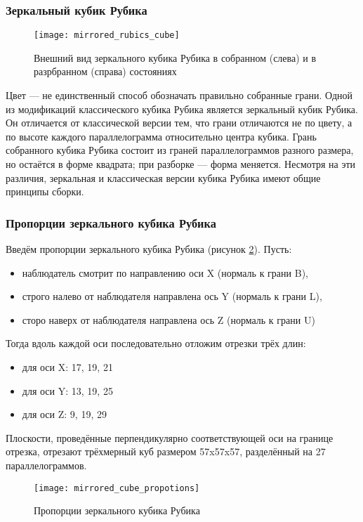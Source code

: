 \subsubsection{Зеркальный кубик Рубика}
\begin{figure}[ht]
	\centering
	\texttt{[image: mirrored\_rubics\_cube]}
	\caption{Внешний вид зеркального кубика Рубика в собранном (слева) и в разрбранном (справа) состояниях}
	\label{fig:mirrored_cube}
\end{figure}

Цвет --- не единственный способ обозначать правильно собранные грани. Одной из модификаций классического кубика Рубика является зеркальный кубик Рубика. Он отличается от классической версии тем, что грани отличаются не по цвету, а по высоте каждого параллелограмма относительно центра кубика. Грань собранного кубика Рубика состоит из граней параллелограммов разного размера, но остаётся в форме квадрата; при разборке --- форма меняется. Несмотря на эти различия, зеркальная и классическая версии кубика Рубика имеют общие принципы сборки.

\subsubsection{Пропорции зеркального кубика Рубика}
Введём пропорции зеркального кубика Рубика (рисунок \ref{fig:mirrored_cube_proportions}). Пусть:
\begin{itemize}
	\item наблюдатель смотрит по направлению оси X (нормаль к грани B),
	\item строго налево от наблюдателя направлена ось Y (нормаль к грани L),
	\item сторо наверх от наблюдателя направлена ось Z (нормаль к грани U)
\end{itemize}

Тогда вдоль каждой оси последовательно отложим отрезки трёх длин:
\begin{itemize}
	\item для оси X: 17, 19, 21
	\item для оси Y: 13, 19, 25
	\item для оси Z: 9, 19, 29
\end{itemize}

Плоскости, проведённые перпендикулярно соответствующей оси на границе отрезка, отрезают трёхмерный куб размером 57x57x57, разделённый на 27 параллелограммов. 

\begin{figure}[ht]
	\centering
	\texttt{[image: mirrored\_cube\_propotions]}
	\caption{Пропорции зеркального кубика Рубика}
	\label{fig:mirrored_cube_proportions}
\end{figure}

